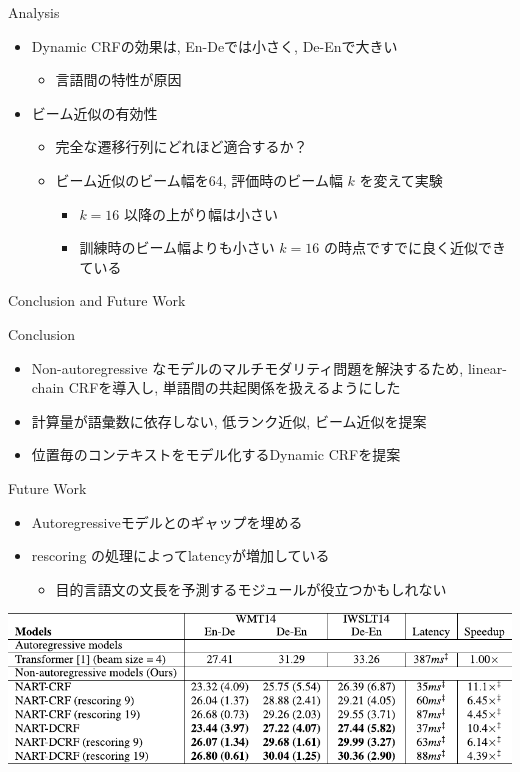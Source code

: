 \documentclass[unicode, 12pt, aspectratio=43]{beamer}
\begin{document}
\begin{frame}[label={sec:orgadd54d4}]{Analysis}
\begin{itemize}
\item Dynamic CRFの効果は, En-Deでは小さく, De-Enで大きい
\begin{itemize}
\item 言語間の特性が原因
\end{itemize}
\item ビーム近似の有効性
\begin{itemize}
\item 完全な遷移行列にどれほど適合するか？
\item ビーム近似のビーム幅を64, 評価時のビーム幅 \(k\) を変えて実験
\begin{itemize}
\item \(k = 16\) 以降の上がり幅は小さい
\item 訓練時のビーム幅よりも小さい \(k = 16\) の時点ですでに良く近似できている
\end{itemize}
\end{itemize}
\end{itemize}
\end{frame}

\begin{frame}[label={sec:org549a0e8}]{Conclusion and Future Work}
\footnotesize

Conclusion
\begin{itemize}
\item Non-autoregressive なモデルのマルチモダリティ問題を解決するため, linear-chain CRFを導入し, 単語間の共起関係を扱えるようにした
\item 計算量が語彙数に依存しない, 低ランク近似, ビーム近似を提案
\item 位置毎のコンテキストをモデル化するDynamic CRFを提案
\end{itemize}

Future Work
\begin{itemize}
\item Autoregressiveモデルとのギャップを埋める
\item rescoring の処理によってlatencyが増加している
\begin{itemize}
\item 目的言語文の文長を予測するモジュールが役立つかもしれない
\end{itemize}
\end{itemize}
\begin{center}
\includegraphics[width=0.8\linewidth]{./figure/Table2_art_nart.pdf}
\end{center}
\end{frame}
\end{document}
